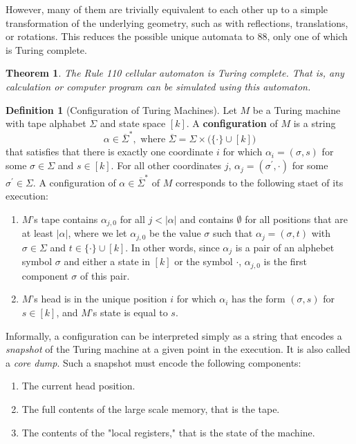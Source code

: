 \documentclass[a4paper, 12pt]{report}
\newtheorem{theorem}{Theorem}[section]
\theoremstyle{remark}
\theoremstyle{definition}
\newtheorem{definition}{Definition}[section]
\begin{document}
However, many of them are trivially equivalent to each other up to a simple transformation of the underlying geometry, such as with reflections, translations, or rotations. This reduces the possible unique automata to 88, only one of which is Turing complete. 

\begin{theorem}
The Rule 110 cellular automaton is Turing complete. That is, any calculation or computer program can be simulated using this automaton. 
\end{theorem}

\begin{definition}[Configuration of Turing Machines]
Let $M$ be a Turing machine with tape alphabet $\Sigma$ and state space $[k]$. A \textbf{configuration} of $M$ is a string 
\[\alpha \in \overline{\Sigma}^*, \text{ where } \overline{\Sigma} = \Sigma \times \big( \{ \cdot \} \cup [k] \big)\]
that satisfies that there is exactly one coordinate $i$ for which $\alpha_i = (\sigma, s)$ for some $\sigma \in \Sigma$ and $s \in [k]$. For all other coordinates $j$, $\alpha_j = (\sigma^\prime, \cdot)$ for some $\sigma^\prime \in \Sigma$. A configuration of $\alpha \in \overline{\Sigma}^*$ of $M$ corresponds to the following staet of its execution: 
\begin{enumerate}
    \item $M$'s tape contains $\alpha_{j, 0}$ for all $j < |\alpha|$ and contains $\emptyset$ for all positions that are at least $|\alpha|$, where we let $\alpha_{j, 0}$ be the value $\sigma$ such that $\alpha_j = (\sigma, t)$ with $\sigma \in \Sigma$ and $t \in \{\cdot\} \cup [k]$. In other words, since $\alpha_j$ is a pair of an alphebet symbol $\sigma$ and either a state in $[k]$ or the symbol $\cdot$, $\alpha_{j, 0}$ is the first component $\sigma$ of this pair. 
    \item $M$'s head is in the unique position $i$ for which $\alpha_i$ has the form $(\sigma, s)$ for $s \in [k]$, and $M$'s state is equal to $s$. 
\end{enumerate}
Informally, a configuration can be interpreted simply as a string that encodes a \textit{snapshot} of the Turing machine at a given point in the execution. It is also called a \textit{core dump}. Such a snapshot must encode the following components: 
\begin{enumerate}
    \item The current head position. 
    \item The full contents of the large scale memory, that is the tape. 
    \item The contents of the "local registers," that is the state of the machine. 
\end{enumerate}
\end{definition}
\end{document}

